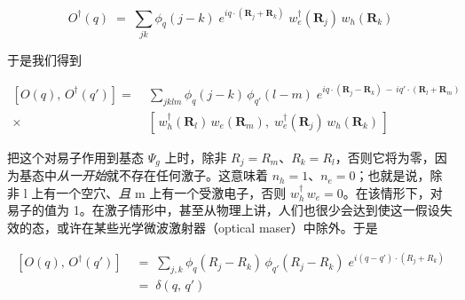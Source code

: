 \begin{equation*}
O^{\dagger}(q) \;=\; \sum_{jk}\phi_q(j-k)\;e^{iq\cdot\left(\mathbf{R}_j + \mathbf{R}_k\right)}\;w_e^{\dagger}(\mathbf{R}_j)\,w_h(\mathbf{R}_k)
\end{equation*}

于是我们得到

\begin{align*}
\left[O(q),\,O^{\dagger}(q')\right] =\; & \sum_{jklm}\phi_q(j-k)\,\phi_{q'}(l-m)\;e^{iq\cdot\left(\mathbf{R}_j - \mathbf{R}_k\right)\,-\,iq'\cdot\left(\mathbf{R}_l + \mathbf{R}_m\right)} \\
\times\; & \left[\,w_h^{\dagger}(\mathbf{R}_l)\,w_e(\mathbf{R}_m),\;w_e^{\dagger}(\mathbf{R}_j)\,w_h(\mathbf{R}_k)\,\right]
\end{align*}

把这个对易子作用到基态 $\Psi_g$ 上时，除非 $R_j = R_m$、$R_k = R_l$，否则它将为零，因为基态中\emph{从一开始}就不存在任何激子。这意味着 $n_h = 1$、$n_e = 0$；也就是说，除非 l 上有一个空穴、\emph{且} m 上有一个受激电子，否则 $w_h^{\dagger}\,w_e = 0$。在该情形下，对易子的值为 1。在激子情形中，甚至从物理上讲，人们也很少会达到使这一假设失效的态，或许在某些光学微波激射器（optical maser）中除外。于是

\begin{align*}
\left[O(q),\,O^{\dagger}(q')\right]\;&=\;\sum_{j,k}\phi_q(R_j - R_k)\,\phi_{q'}(R_j - R_k)\;e^{i(q-q')\cdot\left(R_j + R_k\right)} \\
&=\;\delta(q,\,q')
\end{align*}
